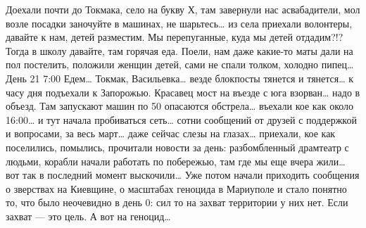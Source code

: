 Доехали почти до Токмака, село на букву Х, там завернули нас асвабадители, мол возле посадки заночуйте в машинах, не шарьтесь… из села приехали волонтеры, давайте к нам, детей разместим. Мы перепуганные, куда мы детей отдадим?!? Тогда в школу давайте, там горячая еда.
Поели, нам даже какие-то маты дали на пол постелить, положили женщин детей, сами не спали толком, холодно пипец…
День 21
7:00 Едем… Токмак, Васильевка… везде блокпосты тянется и тянется… к часу дня подъехали к Запорожью. Красавец мост на въезде с юга взорван… надо в объезд. Там запускают машин по 50 опасаются обстрела… въехали кое как около 16:00… и тут начала пробиваться сеть… сотни сообщений от друзей с поддержкой и вопросами, за весь март… даже сейчас слезы на глазах… приехали, кое как поселились, помылись, прочитали новости за день: разбомбленный драмтеатр с людьми, корабли начали работать по побережью, там где мы еще вчера жили… вот так в последний момент выскочили…
Уже потом начали приходить сообщения о зверствах на Киевщине, о масштабах геноцида в Мариуполе и стало понятно то, что было неочевидно в день 0: сил то на захват территории у них нет. Если захват — это цель. А вот на геноцид…

